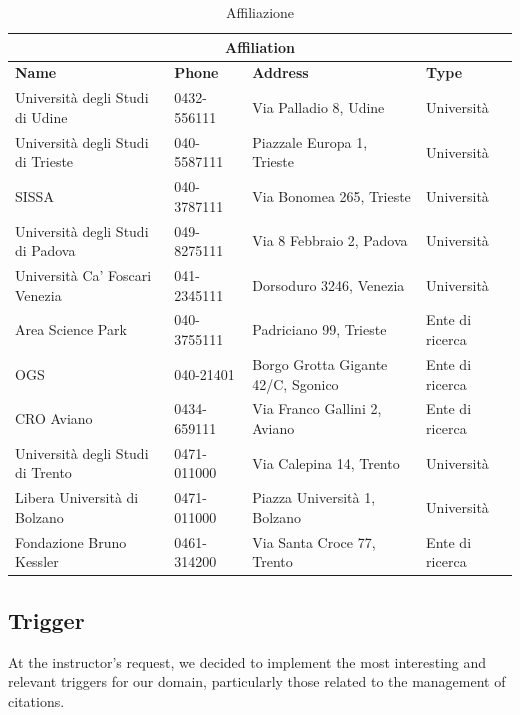 \documentclass[a4paper,12pt]{article}
\begin{document}
\begin{table}[H]
\centering
\caption{Affiliazione}
\small
\begin{tabular}{llll}
\toprule
\multicolumn{4}{c}{\textbf{Affiliation}} \\
\midrule
\textbf{Name} & \textbf{Phone} & \textbf{Address} & \textbf{Type} \\
\midrule
Università degli Studi di Udine   & 0432-556111 & Via Palladio 8, Udine              & Università      \\
Università degli Studi di Trieste & 040-5587111 & Piazzale Europa 1, Trieste         & Università      \\
SISSA                             & 040-3787111 & Via Bonomea 265, Trieste           & Università      \\
Università degli Studi di Padova  & 049-8275111 & Via 8 Febbraio 2, Padova           & Università      \\
Università Ca' Foscari Venezia    & 041-2345111 & Dorsoduro 3246, Venezia            & Università      \\
Area Science Park                 & 040-3755111 & Padriciano 99, Trieste             & Ente di ricerca \\
OGS                               & 040-21401   & Borgo Grotta Gigante 42/C, Sgonico & Ente di ricerca \\
CRO Aviano                        & 0434-659111 & Via Franco Gallini 2, Aviano       & Ente di ricerca \\
Università degli Studi di Trento  & 0471-011000 & Via Calepina 14, Trento            & Università      \\
Libera Università di Bolzano      & 0471-011000 & Piazza Università 1, Bolzano       & Università  \\
Fondazione Bruno Kessler          & 0461-314200 & Via Santa Croce 77, Trento       & Ente di ricerca \\
\bottomrule
\end{tabular}
\end{table}


\subsection{Trigger} \label{subsec:trigger-citazioni}
At the instructor's request, we decided to implement the most interesting and relevant triggers for our domain, particularly those related to the management of citations.
\end{document}
